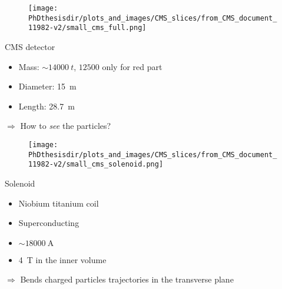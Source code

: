\begin{frame}
\begin{minipage}[t]{.6\textwidth}
\begin{figure}
\texttt{[image: \\PhDthesisdir/plots\_and\_images/CMS\_slices/from\_CMS\_document\_11982-v2/small\_cms\_full.png]}
\end{figure}
\end{minipage}
\hfill\begin{minipage}[t]{.35\textwidth}
\begin{block}{CMS detector}
\begin{itemize}
\item Mass: $\sim\SI{14000}{t}$, $\num{12500}$ only for red part
\item Diameter: \SI{15}{\meter}
\item Length: \SI{28.7}{\meter}
\end{itemize}
\end{block}

\begin{block}{}
$\Rightarrow$ How to \emph{see} the particles?
\end{block}
\end{minipage}
\end{frame}

\begin{frame}
\addtocounter{framenumber}{-1}
\begin{minipage}[t]{.6\textwidth}
\begin{figure}
\texttt{[image: \\PhDthesisdir/plots\_and\_images/CMS\_slices/from\_CMS\_document\_11982-v2/small\_cms\_solenoid.png]}
\end{figure}
\end{minipage}
\hfill\begin{minipage}[t]{.35\textwidth}
\begin{block}{Solenoid}
\begin{itemize}
\item Niobium titanium coil
\item Superconducting
\item $\sim\SI{18000}{\ampere}$
\item \SI{4}{\tesla} in the inner volume
\end{itemize}
\end{block}

\begin{block}{}
$\Rightarrow$ Bends charged particles trajectories in the transverse plane
\end{block}
\end{minipage}
\end{frame}

